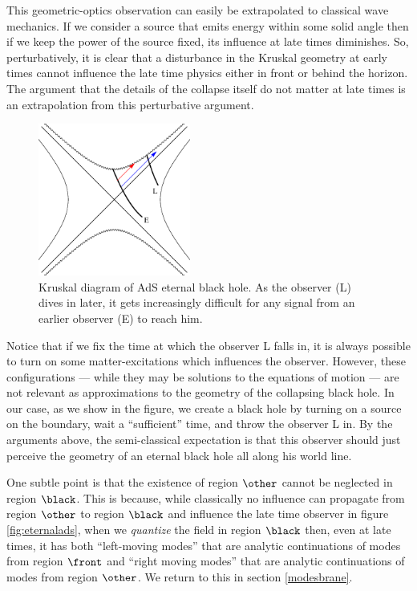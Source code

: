 This geometric-optics observation can easily be extrapolated to classical wave mechanics. If we consider a source that emits energy within some solid angle then if we keep the power of the source fixed, its influence at late times diminishes. So, perturbatively, it is clear that a disturbance in the Kruskal geometry at early times cannot influence the late time physics either in front or behind the horizon. The argument that the details of the collapse itself do not matter at late times is an extrapolation from this perturbative argument. 
\begin{figure}
\begin{center}
\includegraphics[width=5cm]{kruskaldiagram.eps}
\caption{Kruskal diagram of AdS eternal black hole. As the observer (L) dives in later, it gets increasingly difficult for any signal from an earlier observer (E) to reach him. }
\label{fig:kruskal}
\end{center}
\end{figure}

Notice that if we fix the time at which the observer L falls in, it is always possible to turn on some matter-excitations which influences the observer. However, these configurations --- while they may be solutions to the equations of motion --- are not relevant as approximations to the geometry of the collapsing black hole.  In our case, as we show in the figure, we create a black hole by turning on a source on the boundary, wait a ``sufficient'' time, and throw the observer L in. By the arguments above, the semi-classical expectation is that this observer should just perceive the geometry of an eternal black hole all along his world line.

One subtle point is that the existence of region $\other$ cannot be neglected in region $\black$. This is because, while classically no influence can propagate from region $\other$ to region $\black$ and influence the late time observer in figure \ref{fig:eternalads}, when we {\em quantize} the field in region $\black$ then, even at late times, it has both ``left-moving modes'' that are analytic continuations of modes from region $\front$ and ``right moving modes'' that are analytic continuations of modes from region $\other$. We return to this in section \ref{modesbrane}.


